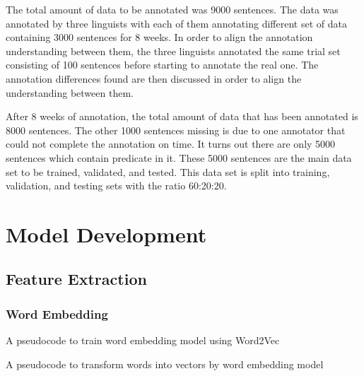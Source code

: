 The total amount of data to be annotated was 9000 sentences. The data was annotated by three linguists with each of them annotating different set of data containing 3000 sentences for 8 weeks. In order to align the annotation understanding between them, the three linguists annotated the same trial set consisting of 100 sentences before starting to annotate the real one. The annotation differences found are then discussed in order to align the understanding between them.

After 8 weeks of annotation, the total amount of data that has been annotated is 8000 sentences. The other 1000 sentences missing is due to one annotator that could not complete the annotation on time. It turns out there are only 5000 sentences which contain predicate in it. These 5000 sentences are the main data set to be trained, validated, and tested. This data set is split into training, validation, and testing sets with the ratio 60:20:20. 

\section{Model Development}
\subsection{Feature Extraction}
\subsubsection{Word Embedding}

\begin{kode}
	
	
	\caption{A pseudocode to train word embedding model using Word2Vec}
	\label{code:trainword2ve}
\end{kode}


\begin{kode}
	
	
	\caption{A pseudocode to transform words into vectors by word embedding model}
	\label{code:ekstraksiownword}
\end{kode}

